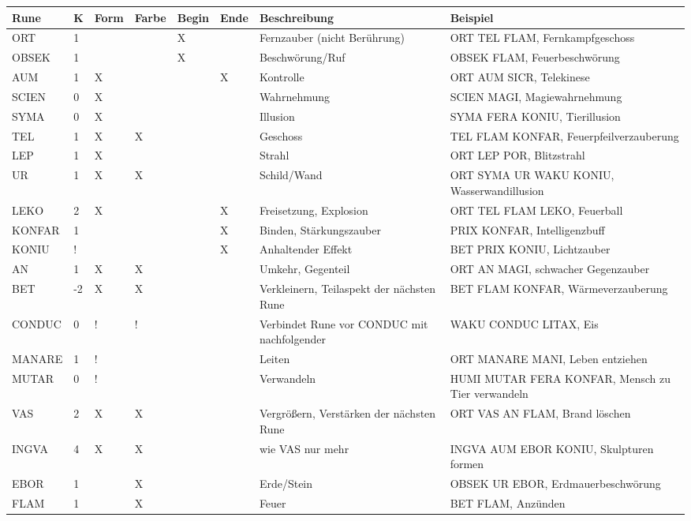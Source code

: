 \documentclass{article}
\begin{document}
\begin{footnotesize}
\begin{tabular}{|m{1.7cm}|m{0.3cm}|m{1cm}|m{1cm}|m{1cm}|m{1cm}|m{3cm}|m{5cm}|}
\hline
\textbf{Rune}&\textbf{K}&\textbf{Form}&\textbf{Farbe}&\textbf{Begin}&\textbf{Ende}&\textbf{Beschreibung}&\textbf{Beispiel}\\
\hline
\hline
ORT&1& & &X& &Fernzauber (nicht Berührung)&ORT TEL FLAM, Fernkampfgeschoss\\
\hline
OBSEK&1& & &X& &Beschwörung/Ruf&OBSEK FLAM, Feuerbeschwörung\\
\hline
\hline
AUM&1&X& & &X&Kontrolle&ORT AUM SICR, Telekinese\\
\hline
SCIEN&0&X& & & &Wahrnehmung&SCIEN MAGI, Magiewahrnehmung\\
\hline
SYMA&0&X& & & &Illusion&SYMA FERA KONIU, Tierillusion\\
\hline
TEL&1&X&X& & &Geschoss&TEL FLAM KONFAR, Feuerpfeilverzauberung\\
\hline
LEP&1&X& & & &Strahl&ORT LEP POR, Blitzstrahl\\
\hline
UR&1&X&X& & &Schild/Wand&ORT SYMA UR WAKU KONIU, Wasserwandillusion\\
\hline
LEKO&2&X& & &X&Freisetzung, Explosion&ORT TEL FLAM LEKO, Feuerball\\
\hline
\hline
KONFAR&1& & & &X&Binden, Stärkungszauber&PRIX KONFAR, Intelligenzbuff\\
\hline
KONIU&!& & & &X&Anhaltender Effekt&BET PRIX KONIU, Lichtzauber\\
\hline
\hline
AN&1&X&X& & &Umkehr, Gegenteil&ORT AN MAGI, schwacher Gegenzauber\\
\hline
BET&-2&X&X& & &Verkleinern, Teilaspekt der nächsten Rune&BET FLAM KONFAR, Wärmeverzauberung\\
\hline
CONDUC&0&!&!& & &Verbindet Rune vor CONDUC mit nachfolgender&WAKU CONDUC LITAX, Eis\\
\hline
MANARE&1&!& & & &Leiten&ORT MANARE MANI, Leben entziehen\\
\hline
MUTAR&0&!& & & &Verwandeln&HUMI MUTAR FERA KONFAR, Mensch zu Tier verwandeln\\
\hline
VAS&2&X&X& & &Vergrößern, Verstärken der nächsten Rune&ORT VAS AN FLAM, Brand löschen\\
\hline
INGVA&4&X&X& & &wie VAS nur mehr&INGVA AUM EBOR KONIU, Skulpturen formen\\
\hline
\hline
EBOR&1& &X& & &Erde/Stein&OBSEK UR EBOR, Erdmauerbeschwörung\\
\hline
FLAM&1& &X& & &Feuer&BET FLAM, Anzünden\\

\end{tabular}
\end{footnotesize}
\end{document}
